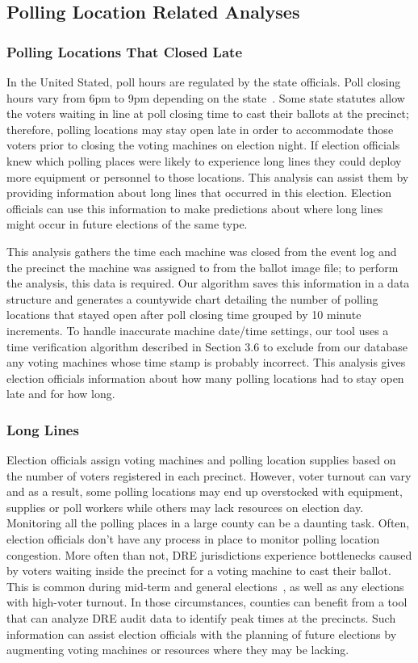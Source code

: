 \subsection{Polling Location Related Analyses}
\subsubsection{Polling Locations That Closed Late}
In the United Stated, poll hours are regulated by the state officials. Poll closing hours vary from 6pm to 9pm depending on the state~\cite{Info2007}. Some state statutes allow the voters waiting in line at poll closing time to cast their ballots at the precinct; therefore,  polling locations may stay open late in order to accommodate those voters prior to closing the voting machines on election night. If election officials knew which polling places were likely to experience long lines they could deploy more equipment or personnel to those locations. This analysis can assist them by providing information about long lines that occurred in this election. Election officials can use this information to make predictions about where long lines might occur in future elections of the same type.

This analysis gathers the time each machine was closed from the event log and the precinct the machine was assigned to from the ballot image file; to perform the analysis, this data is required.  Our algorithm saves this information in a data structure and generates a countywide chart detailing the number of polling locations that stayed open after poll closing time grouped by 10 minute increments. To handle inaccurate machine date/time settings, our tool uses a time verification algorithm described in Section 3.6 to exclude from our database any voting machines whose time stamp is probably incorrect. This analysis gives election officials information about how many polling locations had to stay open late and for how long.

\subsubsection{Long Lines}
Election officials assign voting machines and polling location supplies based on the number of voters registered in each precinct.  However, voter turnout can vary and as a result, some polling locations may end up overstocked with equipment, supplies or poll workers while others may lack resources on election day. Monitoring all the polling places in a large county can be a daunting task. Often, election officials don't have any process in place to monitor polling location congestion. More often than not, DRE jurisdictions experience bottlenecks caused by voters waiting inside the precinct for a voting machine to cast their ballot. This is common during mid-term and general elections~\cite{Kreitman2010, Slade2008, U2010}, as well as any elections with high-voter turnout.  In those circumstances, counties can benefit from a tool that can analyze DRE audit data to identify peak times at the precincts. Such information can assist election officials with the planning of future elections by augmenting voting machines or resources where they may be lacking.


